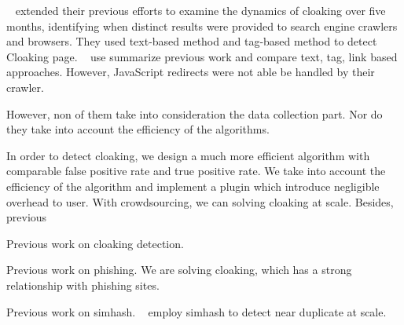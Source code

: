  ~\cite{wang2011cloak}
 extended their previous efforts to examine the dynamics of cloaking over five
 months, identifying when distinct results were provided to search engine
 crawlers and browsers.
They used text-based method and tag-based method to detect Cloaking page.
 ~\cite{deng2013uncovering} use summarize previous work and compare text, tag,
 link based approaches. However, JavaScript redirects were not able be handled by their crawler.

However, non of them take into consideration the data collection part. Nor do
they take into account the efficiency of the algorithms.

In order to detect cloaking, we design a much more efficient algorithm with
comparable false positive rate and true positive rate. We take into account the
efficiency of the algorithm and implement a plugin which introduce negligible
overhead to user. With crowdsourcing, we can solving cloaking at scale.
Besides, previous 

Previous work on cloaking detection.

Previous work on phishing. We are solving cloaking, which has a strong
relationship with phishing sites.

Previous work on simhash. ~\cite{manku2007detecting} employ simhash to detect
near duplicate at scale.

